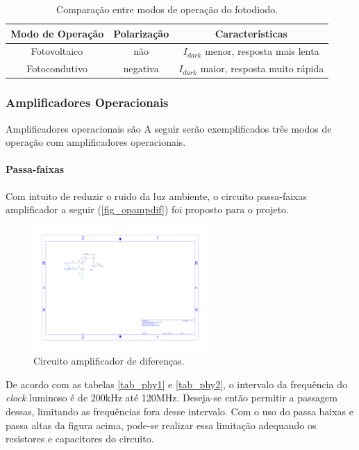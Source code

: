 	\begin{table}[ht]
		\caption{Comparação entre modos de operação do fotodiodo.}
		\centering
		\begin{tabular}{c c c}
			\hline
			Modo de Operação  & Polarização & Características \\ \hline
			Fotovoltaico & não & $I_{dark}$ menor, resposta mais lenta \\
			Fotocondutivo & negativa & $I_{dark}$ maior, resposta muito rápida \\ \hline
		\end{tabular}
		\label{tab_photodiode_comp}
	\end{table}
	
	\subsubsection{Amplificadores Operacionais}\label{hard-opamp}
	
	Amplificadores operacionais são 
	A seguir serão exemplificados três modos de operação com amplificadores operacionais. 
	\paragraph{Passa-faixas}
	Com intuito de reduzir o ruido da luz ambiente, o circuito passa-faixas amplificador a seguir (\autoref{fig_opampdif}) foi proposto para o projeto.
	
	\begin{figure}[h!]
		\caption{\label{fig_opampdif}Circuito amplificador de diferenças.}
		\centering
		\includegraphics[width=0.6\textwidth, trim={5cm 12.29cm 17.6cm 4.3cm},clip]{opamp-dif2.pdf}
	\end{figure}
	
	De acordo com as tabelas \ref{tab_phy1} e \ref{tab_phy2}, o intervalo da frequência do \textit{clock} luminoso é de 200kHz até 120MHz. Deseja-se então  permitir a passagem dessas, limitando as frequências fora desse intervalo. Com o uso do passa baixas e passa altas da figura acima, pode-se realizar essa limitação adequando os resistores e capacitores do circuito.
	
